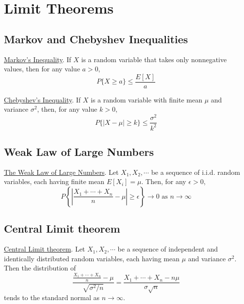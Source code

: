 \chapter{Limit Theorems}
\section{Markov and Chebyshev Inequalities}
\begin{thm}
	{\underline{Markov's Inequality}}. If $X$ is a random variable that takes only nonnegative values, then for any value $a > 0$, $$P\{X \ge a\} \le \frac{E[X]}{a}$$
\end{thm}

\begin{thm}
	{\underline{Chebyshev's Inequality}}. If $X$ is a random variable with finite mean $\mu$ and variance $\sigma^2$, then, for any value $k > 0$, $$P\{|X-\mu| \ge k\} \le \frac{\sigma^2}{k^2}$$
\end{thm}

\section{Weak Law of Large Numbers}
\begin{thm}
	{\underline{The Weak Law of Large Numbers}}. Let $X_1, X_2, \cdots$ be a sequence of i.i.d. random variables, each having finite mean $E[X_i] = \mu$. Then, for any $\epsilon > 0$, $$P\left\{\left|\frac{X_1+\cdots+X_n}{n} - \mu\right| \ge \epsilon \right\} \to 0 \mbox{ as } n \to \infty$$
\end{thm}

\section{Central Limit theorem}
\begin{thm}
	{\underline{Central Limit theorem}}. Let $X_1, X_2, \cdots$ be a sequence of independent and identically distributed random variables, each having mean $\mu$ and variance $\sigma^2$. Then the distribution of $$\frac{\frac{X_1+\cdots+X_n}{n}-\mu}{\sqrt{\sigma^2/n}} = \frac{X_1+\cdots+X_n - n\mu}{\sigma \sqrt{n}}$$ tends to the standard normal as $n \to \infty$.
\end{thm}